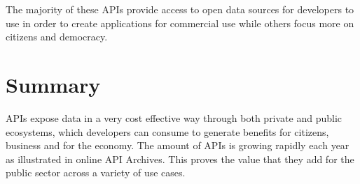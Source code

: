 The majority of these APIs provide access to open data sources for developers to use in
order to create applications for commercial use while others focus more on citizens and democracy.


\section{Summary}

APIs expose data in a very cost effective way through both private and public
ecosystems, which developers can consume  to generate benefits for citizens, business
and for the economy. The amount of APIs is growing rapidly each year as illustrated in 
online API Archives. This proves the value that they add for the public sector across a
variety of use cases.
